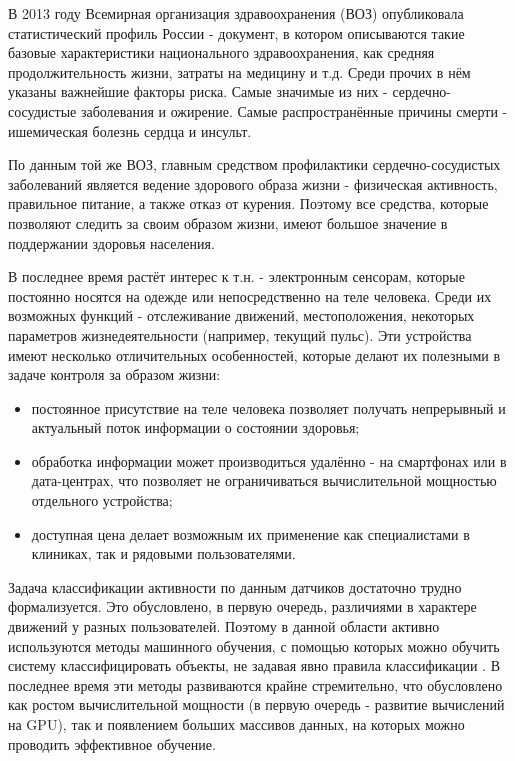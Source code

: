 \intro

В 2013 году Всемирная организация здравоохранения (ВОЗ) опубликовала статистический профиль России - документ, в котором описываются такие базовые характеристики национального здравоохранения, как средняя продолжительность жизни, затраты на медицину и т.д\cite{who_russia_profile}. Среди прочих в нём указаны важнейшие факторы риска. Самые значимые из них - сердечно-сосудистые заболевания и ожирение. Самые распространённые причины смерти - ишемическая болезнь сердца и инсульт. 

По данным той же ВОЗ\cite{who_cardiovascular}, главным средством профилактики сердечно-сосудистых заболеваний является ведение здорового образа жизни - физическая активность, правильное питание, а также отказ от курения. Поэтому все средства, которые позволяют следить за своим образом жизни, имеют большое значение в поддержании здоровья населения.

В последнее время растёт интерес к т.н.  - электронным сенсорам, которые постоянно носятся на одежде или непосредственно на теле человека. Среди их возможных функций - отслеживание движений, местоположения, некоторых параметров жизнедеятельности (например, текущий пульс). Эти устройства имеют несколько отличительных особенностей, которые делают их полезными в задаче контроля за образом жизни:
\begin{itemize}
\item постоянное присутствие на теле человека позволяет получать непрерывный и актуальный поток информации о состоянии здоровья;
\item обработка информации может производиться удалённо - на смартфонах или в дата-центрах, что позволяет не ограничиваться вычислительной мощностью отдельного устройства;
\item доступная цена делает возможным их применение как специалистами в клиниках, так и рядовыми пользователями.
\end{itemize}

Задача классификации активности по данным датчиков достаточно трудно формализуется. Это обусловлено, в первую очередь, различиями в характере движений у разных пользователей. Поэтому в данной области активно используются методы машинного обучения, с помощью которых можно обучить систему классифицировать объекты, не задавая явно правила классификации . В последнее время эти методы развиваются крайне стремительно, что обусловлено как ростом вычислительной мощности (в первую очередь - развитие вычислений на GPU), так и появлением больших массивов данных, на которых можно проводить эффективное обучение.

